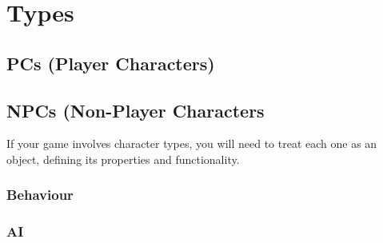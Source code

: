 \section{Types} %

\subsection{PCs (Player Characters)} %

\subsection{NPCs (Non-Player Characters} %

If your game involves character types, you will need to treat each one as an
object, defining its properties and functionality.

\subsubsection{Behaviour} %

\subsubsection{AI} %